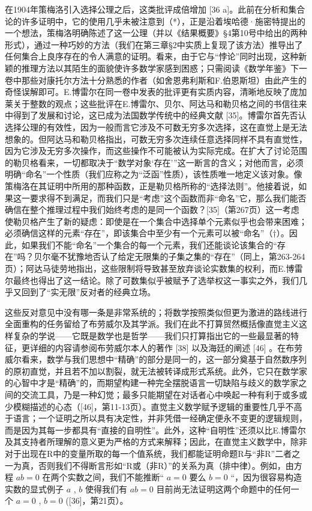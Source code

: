 在1904年策梅洛引入选择公理之后，这类批评成倍增加 {[}36 a{]}。此前在分析和集合论的许多证明中，它的使用几乎未被注意到（*），正是沿着埃哈德·施密特提出的一个想法，策梅洛明确陈述了这一公理（并以《结果概要》§4第10号中给出的两种形式），通过一种巧妙的方法（我们在第三章§2中实质上复现了该方法）推导出了任何集合上良序存在的令人满意的证明。看来，由于它与“悖论”同时出现，这种新颖的推理方法以其陌生的面貌使许多数学家感到困惑；只需阅读《数学年鉴》下一卷中那些对康托尔方法十分熟悉的作者（如舍恩弗利斯和F.伯恩斯坦）由此产生的奇怪误解即可。E.博雷尔在同一卷中发表的批评更有实质内容，清晰地反映了庞加莱关于整数的观点；这些批评在E.博雷尔、贝尔、阿达马和勒贝格之间的书信往来中得到了发展和讨论，这已成为法国数学传统中的经典文献 {[}35{]}。博雷尔首先否认选择公理的有效性，因为一般而言它涉及不可数无穷多次选择，这在直觉上是无法想象的。但阿达马和勒贝格指出，可数无穷多次连续任意选择同样不具有直觉性，因为它涉及无穷多次操作，而这些操作不可能被认为实际完成。在扩大了讨论范围的勒贝格看来，一切都取决于“数学对象‘存在’”这一断言的含义；对他而言，必须明确“命名”一个性质（我们应称之为“泛函”性质），该性质唯一地定义该对象。像策梅洛在其证明中所用的那种函数，正是勒贝格所称的“选择法则”。他接着说，如果这一要求得不到满足，而我们只是“考虑”这个函数而非“命名”它，那么我们能否确信在整个推理过程中我们始终考虑的是同一个函数？{[}35{]}（第267页）这一考虑使勒贝格产生了新的疑虑：即使是在一个集合中选择单个元素似乎也会带来困难；必须确信这样的元素“存在”，即该集合中至少有一个元素可以被“命名”（†）。因此，如果我们不能“命名”一个集合的每一个元素，我们还能谈论该集合的“存在”吗？贝尔毫不犹豫地否认了给定无限集的子集之集的“存在”（同上，第263-264页）；阿达马徒劳地指出，这些限制将导致甚至放弃谈论实数集的权利，而E.博雷尔最终也得出了这一结论。除了可数集似乎被赋予了选举权这一事实之外，我们几乎又回到了“实无限”反对者的经典立场。

这些反对意见中没有哪一条是非常系统的；将数学按照类似但更为激进的路线进行全面重构的任务留给了布劳威尔及其学派。我们在此不打算贸然概括像直觉主义这样复杂的学说——它既是数学也是哲学——我们只打算指出它的一些最显著的特征，更详细的内容请参阅布劳威尔本人的著作 {[}38{]} 以及海廷的阐述 {[}46{]} 。在布劳威尔看来，数学与我们思想中“精确”的部分是同一的，这一部分奠基于自然数序列的原初直觉，并且若不加以割裂，就无法被转译成形式系统。此外，它只在数学家的心智中才是“精确”的，而期望构建一种完全摆脱语言一切缺陷与歧义的数学家之间的交流工具，乃是一种幻觉；最多只能期望在对话者心中唤起一种有利于或多或少模糊描述的心态（{[}46{]}，第11-13页）。直觉主义数学赋予逻辑的重要性几乎不高于语言；一个证明之所以具有决定性，并非凭借一经确定便永不变更的逻辑规则，而是因为其每一步都具有“直接的自明性”。此外，这种“自明性”还须以比E.博雷尔及其支持者所理解的意义更为严格的方式来解释；因此，在直觉主义数学中，除非对于出现在R中的变量所取的每一个值系统，我们都能证明命题R与“非R”二者之一为真，否则我们不得断言形如“R或（非R）”的关系为真（排中律）。例如，由方程 \(ab = 0\) 在两个实数之间，我们不能推断“ \(a = 0\) 要么 \(b = 0\) ``，因为很容易构造实数的显式例子 \(a\) , \(b\) 使得我们有 \(ab = 0\) 目前尚无法证明这两个命题中的任何一个 \(a = 0\) , \(b = 0\) ({[}36{]}，第21页）。

